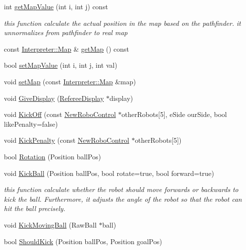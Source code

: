 \begin{DoxyCompactItemize}
\item 
int \hyperlink{classTeamRobot_abc3a5d2d4cac44629a9d8851164b5eda}{getMapValue} (int i, int j) const 
\begin{DoxyCompactList}\small\item\em this function calculate the actual position in the map based on the pathfinder. it unnormalizes from pathfinder to real map \item\end{DoxyCompactList}\item 
const \hyperlink{classMatrix}{Interpreter::Map} \& \hyperlink{classTeamRobot_a8b5fa0d9f42166fc3339ec901fad5a91}{getMap} () const 
\item 
bool \hyperlink{classTeamRobot_a28ee2460e7d465989bb0582782db851e}{setMapValue} (int i, int j, int val)
\item 
void \hyperlink{classTeamRobot_ab8c92b6228aed8eef31d0b1b0fce8690}{setMap} (const \hyperlink{classMatrix}{Interpreter::Map} \&map)
\item 
void \hyperlink{classTeamRobot_a2caa2411b9972fa5caa595f568394ba0}{GiveDisplay} (\hyperlink{classRefereeDisplay}{RefereeDisplay} $\ast$display)
\item 
void \hyperlink{classTeamRobot_a162c8b33d4315a61d8371dc9a923b37b}{KickOff} (const \hyperlink{classNewRoboControl}{NewRoboControl} $\ast$otherRobots\mbox{[}5\mbox{]}, eSide ourSide, bool likePenalty=false)
\item 
void \hyperlink{classTeamRobot_ad5755055df84960c8d1a0a40efe33668}{KickPenalty} (const \hyperlink{classNewRoboControl}{NewRoboControl} $\ast$otherRobots\mbox{[}5\mbox{]})
\item 
bool \hyperlink{classTeamRobot_aa1bb9ac05c067a68118c8646c8d71830}{Rotation} (Position ballPos)
\item 
void \hyperlink{classTeamRobot_a36d006bfeadfcdd37bd1eeb47223bdba}{KickBall} (Position ballPos, bool rotate=true, bool forward=true)
\begin{DoxyCompactList}\small\item\em this function calculate whether the robot should move forwards or backwards to kick the ball. Furthermore, it adjusts the angle of the robot so that the robot can hit the ball precisely. \item\end{DoxyCompactList}\item 
void \hyperlink{classTeamRobot_a98d044ad3907493236b2d399a26cb9ac}{KickMovingBall} (RawBall $\ast$ball)
\item 
bool \hyperlink{classTeamRobot_ac979572f4899940e88f067102ac1ae46}{ShouldKick} (Position ballPos, Position goalPos)

\end{DoxyCompactItemize}
